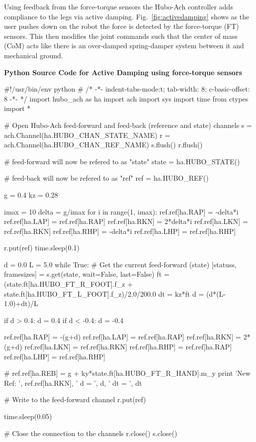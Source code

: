 Using feedback from the force-torque sensors the Hubo-Ach controller adds compliance to the legs via active damping.
Fig.~\ref{fig:activedamping} shows as the user pushes down on the robot the force is detected by the force-torque (FT) sensors.
This then modifies the joint commands such that the center of mass (CoM) acts like there is an over-damped spring-damper system between it and mechanical ground.

\footnotesize
\noindent \textbf{Python Source Code for Active Damping using force-torque sensors}
\vspace{-6mm}
\begin{code}

#!/usr/bin/env python
# /* -*-  indent-tabs-mode:t; tab-width: 8; c-basic-offset: 8  -*- */
import hubo_ach as ha
import ach
import sys
import time
from ctypes import *

# Open Hubo-Ach feed-forward and feed-back (reference and state) channels
s = ach.Channel(ha.HUBO_CHAN_STATE_NAME)
r = ach.Channel(ha.HUBO_CHAN_REF_NAME)
s.flush()
r.flush()

# feed-forward will now be refered to as "state"
state = ha.HUBO_STATE()

# feed-back will now be refered to as "ref"
ref = ha.HUBO_REF()

g = 0.4
kz = 0.28

imax = 10
delta = g/imax
for i in range(1, imax):
  ref.ref[ha.RAP] = -delta*i
  ref.ref[ha.LAP] = ref.ref[ha.RAP]
  ref.ref[ha.RKN] = 2*delta*i
  ref.ref[ha.LKN] = ref.ref[ha.RKN]
  ref.ref[ha.RHP] = -delta*i
  ref.ref[ha.LHP] = ref.ref[ha.RHP]

  r.put(ref)
  time.sleep(0.1)

d = 0.0
L = 5.0
while True:
  # Get the current feed-forward (state) 
  [statuss, framesizes] = s.get(state, wait=False, last=False)
  ft = (state.ft[ha.HUBO_FT_R_FOOT].f_z + state.ft[ha.HUBO_FT_L_FOOT].f_z)/2.0/200.0
  dt = kz*ft
  d = (d*(L-1.0)+dt)/L

  if d > 0.4: 
    d = 0.4
  if d < -0.4:
    d = -0.4

  ref.ref[ha.RAP] = -(g+d)
  ref.ref[ha.LAP] = ref.ref[ha.RAP]
  ref.ref[ha.RKN] = 2*(g+d)
  ref.ref[ha.LKN] = ref.ref[ha.RKN]
  ref.ref[ha.RHP] = ref.ref[ha.RAP]
  ref.ref[ha.LHP] = ref.ref[ha.RHP]

#  ref.ref[ha.REB] = g + ky*state.ft[ha.HUBO_FT_R_HAND].m_y
  print 'New Ref: ', ref.ref[ha.RKN], ' d = ', d, ' dt = ', dt

  # Write to the feed-forward channel
  r.put(ref)

  time.sleep(0.05)  

# Close the connection to the channels
r.close()
s.close()
\end{code}
\normalsize

